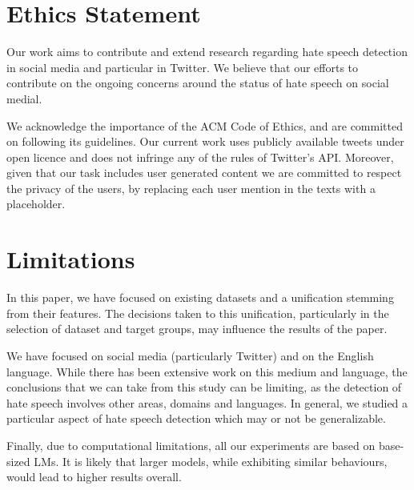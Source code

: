 \section{Ethics Statement}
Our work aims to contribute and extend research regarding hate speech detection in social media and particular in Twitter. We believe that our efforts to contribute on the ongoing concerns around the status of hate speech on social medial.

We acknowledge the importance of the ACM Code of Ethics, and are committed on following its guidelines. Our current work uses publicly available tweets under open licence and does not infringe any of the rules of Twitter's \ac{API}. Moreover, given that our task includes user generated content we are committed to respect the privacy of the users, by replacing each user mention in the texts with a placeholder. 


\section{Limitations}
In this paper, we have focused on existing datasets and a unification stemming from their features. The decisions taken to this unification, particularly in the selection of dataset and target groups, may influence the results of the paper. 

We have focused on social media (particularly Twitter) and on the English language. While there has been extensive work on this medium and language, the conclusions that we can take from this study can be limiting, as the detection of hate speech involves other areas, domains and languages. In general, we studied a particular aspect of hate speech detection which may or not be generalizable.

Finally, due to computational limitations, all our experiments are based on base-sized \acp{LM}. It is likely that larger models, while exhibiting similar behaviours, would lead to higher results overall.







